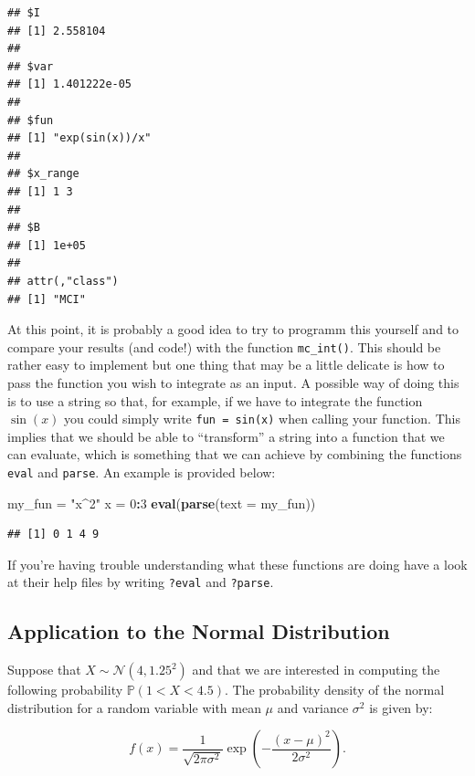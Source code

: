 \documentclass[12pt,]{krantz}
\newenvironment{Shaded}{\begin{snugshade}}{\end{snugshade}}
\newcommand{\KeywordTok}[1]{\textcolor[rgb]{0.27,0.27,0.27}{\textbf{#1}}}
\newcommand{\DataTypeTok}[1]{\textcolor[rgb]{0.27,0.27,0.27}{#1}}
\newcommand{\DecValTok}[1]{\textcolor[rgb]{0.06,0.06,0.06}{#1}}
\newcommand{\StringTok}[1]{\textcolor[rgb]{0.5,0.5,0.5}{#1}}
\newcommand{\OperatorTok}[1]{\textcolor[rgb]{0.43,0.43,0.43}{\textbf{#1}}}
\newcommand{\NormalTok}[1]{#1}
\begin{document}
\begin{verbatim}
## $I
## [1] 2.558104
## 
## $var
## [1] 1.401222e-05
## 
## $fun
## [1] "exp(sin(x))/x"
## 
## $x_range
## [1] 1 3
## 
## $B
## [1] 1e+05
## 
## attr(,"class")
## [1] "MCI"
\end{verbatim}

At this point, it is probably a good idea to try to programm this
yourself and to compare your results (and code!) with the function
\texttt{mc\_int()}. This should be rather easy to implement but one
thing that may be a little delicate is how to pass the function you wish
to integrate as an input. A possible way of doing this is to use a
string so that, for example, if we have to integrate the function
\(\sin(x)\) you could simply write \texttt{fun\ =\ sin(x)} when calling
your function. This implies that we should be able to ``transform'' a
string into a function that we can evaluate, which is something that we
can achieve by combining the functions \texttt{eval} and \texttt{parse}.
An example is provided below:

\begin{Shaded}
\begin{Highlighting}[]
\NormalTok{my_fun =}\StringTok{ "x^2"}
\NormalTok{x =}\StringTok{ }\DecValTok{0}\OperatorTok{:}\DecValTok{3}
\KeywordTok{eval}\NormalTok{(}\KeywordTok{parse}\NormalTok{(}\DataTypeTok{text =}\NormalTok{ my_fun))}
\end{Highlighting}
\end{Shaded}

\begin{verbatim}
## [1] 0 1 4 9
\end{verbatim}

If you're having trouble understanding what these functions are doing
have a look at their help files by writing \texttt{?eval} and
\texttt{?parse}.

\subsection{Application to the Normal
Distribution}\label{application-to-the-normal-distribution}

Suppose that \(X \sim \mathcal{N}(4, 1.25^2)\) and that we are
interested in computing the following probability
\(\mathbb{P}\left(1 < X < 4.5 \right)\). The probability density of the
normal distribution for a random variable with mean \(\mu\) and variance
\(\sigma^2\) is given by:

\[
f(x) = \frac{1}{\sqrt{2 \pi \sigma^2}} \exp \left(- \frac{\left(x - \mu\right)^2}{2 \sigma^2}\right).
\]
\end{document}

